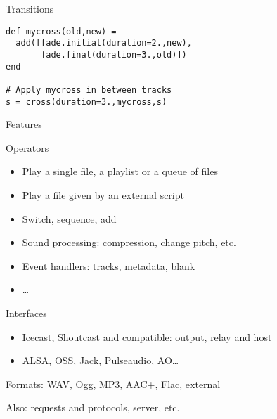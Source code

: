 \documentclass{beamer}
\newcommand{\kw}[1]{{\color{red} #1}}
\renewcommand{\textbf}[1]{{\color{blue} #1}}
\begin{document}

\begin{frame}[fragile]{Transitions}

 \begin{center}
\end{center}

\vfill
\pause

\begin{lstlisting}
def mycross(old,new) =
  add([fade.initial(duration=2.,new),
       fade.final(duration=3.,old)])
end

# Apply mycross in between tracks
s = cross(duration=3.,mycross,s)
\end{lstlisting}

\end{frame}


\begin{frame}{Features}

\begin{block}{Operators}
\begin{itemize}
\item Play a \kw{single} file, a \kw{playlist} or a queue of files
\item Play a file given by an external script
\item Switch, sequence, add
\item Sound processing: compression, change pitch, etc.
\item Event handlers: tracks, metadata, blank
\item \ldots
\end{itemize}
\end{block}

\begin{block}{Interfaces}
\begin{itemize}
\item Icecast, Shoutcast and compatible: output, relay and host
\item ALSA, OSS, Jack, Pulseaudio, AO\ldots
\end{itemize}
\end{block}

\textbf{Formats:} WAV, Ogg, MP3, AAC+, Flac, external

\textbf{Also}: requests and protocols, server, etc.

\end{frame}
\end{document}
